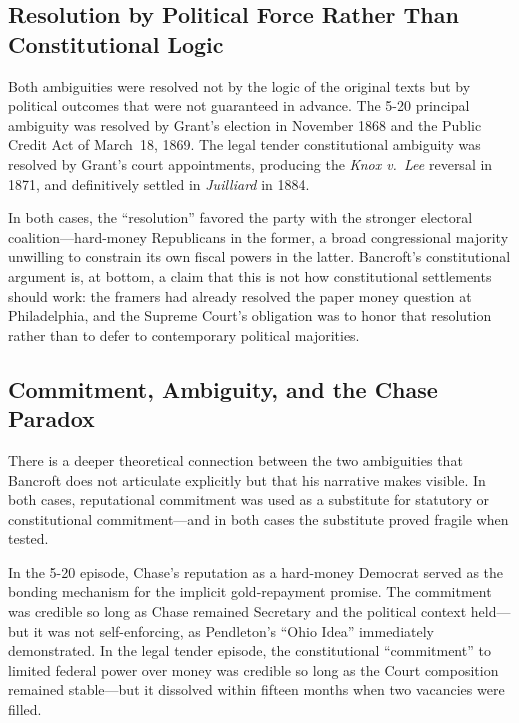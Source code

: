 \documentclass[12pt]{article}
\begin{document}
\subsection{Resolution by Political Force Rather Than Constitutional Logic}

Both ambiguities were resolved not by the logic of the original texts but
by political outcomes that were not guaranteed in advance. The 5-20
principal ambiguity was resolved by Grant's election in November 1868
and the Public Credit Act of March~18, 1869. The legal tender
constitutional ambiguity was resolved by Grant's court appointments,
producing the \textit{Knox v.\ Lee} reversal in 1871, and definitively
settled in \textit{Juilliard} in 1884.

In both cases, the ``resolution'' favored the party with the stronger
electoral coalition---hard-money Republicans in the former, a broad
congressional majority unwilling to constrain its own fiscal powers
in the latter. Bancroft's constitutional argument is, at bottom, a claim
that this is not how constitutional settlements should work: the framers
had already resolved the paper money question at Philadelphia, and the
Supreme Court's obligation was to honor that resolution rather than to
defer to contemporary political majorities.

\subsection{Commitment, Ambiguity, and the Chase Paradox}

There is a deeper theoretical connection between the two ambiguities that
Bancroft does not articulate explicitly but that his narrative makes
visible. In both cases, reputational commitment was used as a substitute
for statutory or constitutional commitment---and in both cases the
substitute proved fragile when tested.

In the 5-20 episode, Chase's reputation as a hard-money Democrat served
as the bonding mechanism for the implicit gold-repayment promise. The
commitment was credible so long as Chase remained Secretary and the
political context held---but it was not self-enforcing, as Pendleton's
``Ohio Idea'' immediately demonstrated. In the legal tender episode,
the constitutional ``commitment'' to limited federal power over money
was credible so long as the Court composition remained stable---but it
dissolved within fifteen months when two vacancies were filled.
\end{document}
